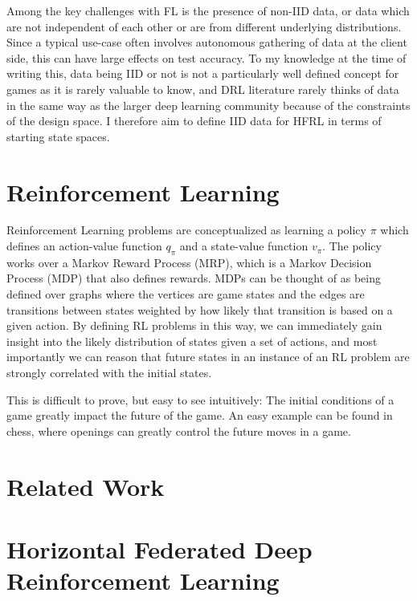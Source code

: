 \documentclass[10pt,journal]{IEEEtran}
\begin{document}
Among the key challenges with FL is the presence of non-IID data, or data which are not independent of
each other or are from different underlying distributions. Since a typical use-case often involves autonomous
gathering of data at the client side, this can have large effects on test accuracy. To my knowledge at the time
of writing this, data being IID or not is not a particularly well defined concept for games as it is rarely
valuable to know, and DRL literature rarely thinks of data in the same way as the larger deep learning community
because of the constraints of the design space. I therefore aim to define IID data for HFRL in terms of starting
state spaces.

\section{Reinforcement Learning}

Reinforcement Learning problems are conceptualized as learning a policy $\pi$ which defines an action-value
function $q_\pi$ and a state-value function $v_\pi$. The policy works over a Markov Reward Process (MRP),
which is a Markov Decision Process (MDP) that also defines rewards. MDPs can be thought of as being defined
over graphs where the vertices are game states and the edges are transitions between states weighted
by how likely that transition is based on a given action. By defining RL problems in this way, we can
immediately gain insight into the likely distribution of states given a set of actions, and most importantly
we can reason that future states in an instance of an RL problem are strongly correlated with the initial
states.

This is difficult to prove, but easy to see intuitively: The initial conditions of a game greatly impact
the future of the game. An easy example can be found in chess, where openings can greatly control the
future moves in a game.

\section{Related Work}

\section{Horizontal Federated Deep Reinforcement Learning}
\end{document}
